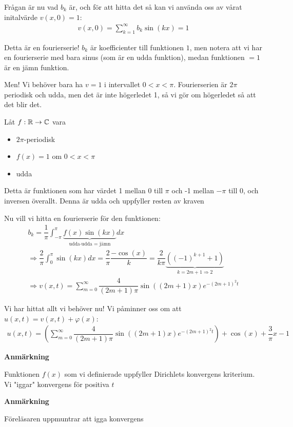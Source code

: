 \noindent Frågan är nu vad $b_k$ är, och för att hitta det så kan vi använda oss av vårat initalvärde $v(x,0) = 1$:
\begin{equation*}
  \begin{gathered}
    v(x,0) = \sum_{k=1}^{\infty}b_k\sin(kx) = 1
  \end{gathered}
\end{equation*}\par
\noindent Detta är en fourierserie! $b_k$ är koefficienter till funktionen $1$, men notera att vi har en fourierserie med bara sinus (som är en udda funktion), medan funktionen $=1$ är en jämn funktion.\par
\noindent Men! Vi behöver bara ha $v = 1$ i intervallet $0<x<\pi$. Fourierserien är $2\pi$ periodisk och udda, men det är inte högerledet 1, så vi gör om högerledet så att det blir det.
\par\bigskip
\noindent Låt $f:\mathbb{R}\to\mathbb{C}$ vara\par
\begin{itemize}
  \item $2\pi$-periodisk
  \item $f(x) = 1$ om $0<x<\pi$
  \item udda
\end{itemize}\par
\noindent Detta är funktionen som har värdet 1 mellan 0 till $\pi$ och -1 mellan $-\pi$ till 0, och inversen överallt. Denna är udda och uppfyller resten av kraven
\par\bigskip
\noindent Nu vill vi hitta en fourierserie för den funktionen:
\begin{equation*}
  \begin{gathered}
    b_k = \dfrac{1}{\pi}\int_{-\pi}^{\pi}\underbrace{f(x)\sin(kx)}_{\text{udda$\cdot$udda = jämn}}dx\\
    \Rightarrow \dfrac{2}{\pi}\int_{0}^{\pi}\sin(kx)dx = \dfrac{2}{\pi}\dfrac{-\cos(x)}{k} = \dfrac{2}{k\pi}\underbrace{\left((-1)^{k+1}+1\right)}_{\text{$k = 2m+1\Rightarrow 2$}}\\
    \Rightarrow v(x,t) = \sum_{m=0}^{\infty}\dfrac{4}{(2m+1)\pi}\sin\left((2m+1)x\right)e^{-(2m+1)^2t}
  \end{gathered}
\end{equation*}
\par\bigskip
\noindent Vi har hittat allt vi behöver nu! Vi påminner oss om att $u(x,t) = v(x,t)+\varphi(x)$:
\begin{equation*}
  \begin{gathered}
    u(x,t) = \left(\sum_{m=0}^{\infty}\dfrac{4}{(2m+1)\pi}\sin((2m+1)x)e^{-(2m+1)^2t}\right) + \cos(x)+\dfrac{3}{\pi}x-1
  \end{gathered}
\end{equation*}
\par\bigskip
\noindent\textbf{Anmärkning}\par
\noindent Funktionen $f(x)$ som vi definierade uppfyller Dirichlets konvergens kriterium. Vi "iggar" konvergens för positiva $t$
\par\bigskip
\noindent\textbf{Anmärkning}\par
\noindent Föreläsaren uppmuntrar att igga konvergens
